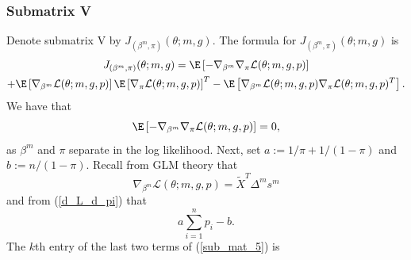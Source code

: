 \documentclass[12pt]{article}
\begin{document}
\begin{appendices}
\subsubsection*{Submatrix V}
Denote submatrix V by $J_{(\beta^m,\pi)}(\theta; m, g).$ The formula for $J_{(\beta^m,\pi)}(\theta; m, g)$ is
\begin{multline}\label{sub_mat_5}
J_{(\beta^m,\pi)}(\theta; m, g) = \E \left[ - \nabla_{\beta^m} \nabla_{ \pi } \mathcal{L}(\theta; m, g, p) \right] \\ + \E\left[ \nabla_{\beta^m}\mathcal{L}(\theta ; m,g,p) \right] \E \left[ \nabla_{\pi}\mathcal{L}(\theta ; m,g,p) \right]^T  - \E \left[ \nabla_{\beta^m}\mathcal{L}(\theta; m,g,p) \nabla_{\pi}\mathcal{L}(\theta; m,g,p)^T \right].
\end{multline}
We have that
\begin{equation}\label{sub_mat_5_1}
\E \left[ - \nabla_{\beta^m} \nabla_{ \pi } \mathcal{L}(\theta; m, g, p) \right] = 0,
\end{equation}
as $\beta^m$ and $\pi$ separate in the log likelihood. Next, set $a := 1/\pi + 1/(1 - \pi)$ and $b := n/(1 - \pi).$ Recall from GLM theory that
$$\nabla_{\beta^m} \mathcal{L}(\theta; m, g, p) = \tilde{X}^T \Delta^m s^m$$ and from (\ref{d_L_d_pi}) that
$$ a \sum_{i=1}^n p_i - b.$$
The $k$th entry of the last two terms of (\ref{sub_mat_5}) is
\begin{multline}\label{sub_mat_5_2}

\end{multline}
\end{appendices}
\end{document}
